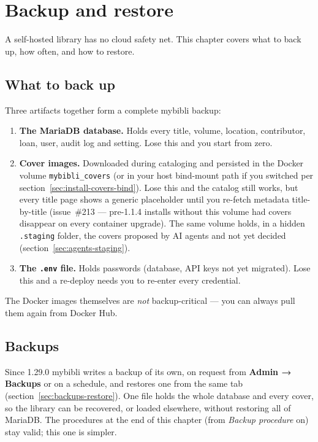 \chapter{Backup and restore}
\label{ch:backup}

A self-hosted library has no cloud safety net. This chapter covers
what to back up, how often, and how to restore.

\section{What to back up}

Three artifacts together form a complete mybibli backup:

\begin{enumerate}
  \item \textbf{The MariaDB database.} Holds
        every title, volume, location, contributor, loan, user,
        audit log and setting. Lose this and you start from zero.
  \item \textbf{Cover images.} Downloaded during
        cataloging and persisted in the Docker volume
        \texttt{mybibli\_covers} (or in your host bind-mount path if
        you switched per
        section~\ref{sec:install-covers-bind}). Lose this and the
        catalog still works, but every title page shows a generic
        placeholder until you re-fetch metadata title-by-title
        (issue~\#213 — pre-1.1.4 installs without this volume had
        covers disappear on every container upgrade). The same
        volume holds, in a hidden \texttt{.staging} folder, the
        covers proposed by AI agents and not yet decided
        (section~\ref{sec:agents-staging}).
  \item \textbf{The \texttt{.env} file.} Holds
        passwords (database, API keys not yet migrated). Lose this
        and a re-deploy needs you to re-enter every credential.
\end{enumerate}

The Docker images themselves are \emph{not} backup-critical — you
can always pull them again from Docker Hub.

\section{Backups}
\label{sec:backups}

Since 1.29.0 mybibli writes a backup of its own, on request from
\textbf{Admin → Backups} or on a schedule,
and restores one from the same tab (section~\ref{sec:backups-restore}).
One file holds the whole database and every cover, so the library can
be recovered, or loaded elsewhere, without restoring all of MariaDB.
The procedures at the end of this chapter (from
\emph{Backup procedure} on) stay valid; this one is simpler.

